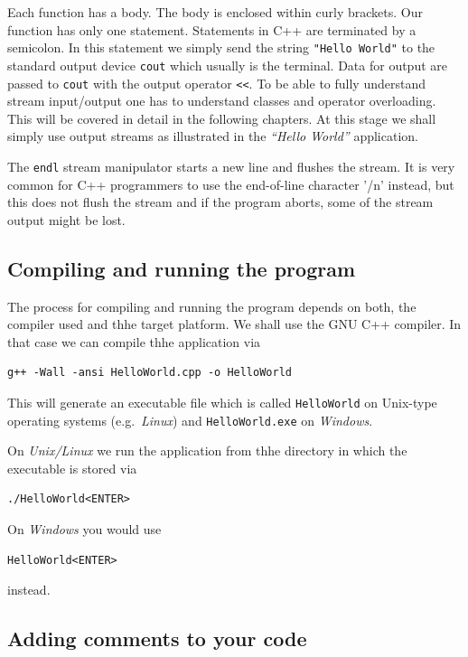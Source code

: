 Each function has a body. The body is enclosed within curly brackets. Our function has
only one statement. Statements in C++ are terminated by a semicolon. In this statement
we simply send the string \verb+"Hello World"+ to the standard output device \verb+cout+
which usually is the terminal. Data for output are passed to \verb+cout+ with the output
operator \verb+<<+. To be able to fully understand stream input/output one has to
understand classes and operator overloading. This will be covered in detail in the
following chapters. At this stage we shall simply use output streams as illustrated in
the {\it ``Hello World''} application.

The \verb+endl+ stream manipulator starts a new line and flushes the stream. It is very common
for C++ programmers to use the end-of-line character '/n' instead, but this does not flush
the stream and if the program aborts, some of the stream output might be lost.


\subsection{Compiling and running the program}

The process for compiling and running the program depends on both, the
compiler used and thhe target platform. We shall use the GNU C++ compiler.
In that case we can compile thhe application via

{\small \begin{verbatim}
g++ -Wall -ansi HelloWorld.cpp -o HelloWorld
\end{verbatim}}

This will generate an executable file which is called \verb+HelloWorld+
on Unix-type operating systems (e.g.\ {\em Linux}) and \verb+HelloWorld.exe+
on {\em Windows}.

On {\em Unix/Linux} we run the application from thhe directory in  which
the executable is stored via
{\small \begin{verbatim}
./HelloWorld<ENTER>
\end{verbatim}}

On {\em Windows} you would use
{\small \begin{verbatim}
HelloWorld<ENTER>
\end{verbatim}}
instead.

\subsection{Adding comments to your code}

